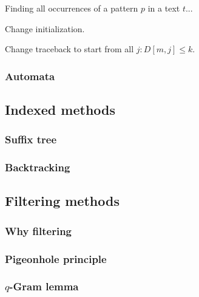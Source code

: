Finding all occurrences of a pattern $p$ in a text $t$...

Change initialization.

Change traceback to start from all $j : D[m,j] \leq k$.



\subsubsection{Automata}




\subsection{Indexed methods}

\subsubsection{Suffix tree}

\subsubsection{Backtracking}


\subsection{Filtering methods}

\subsubsection{Why filtering}

\subsubsection{Pigeonhole principle}

\subsubsection{$q$-Gram lemma}

